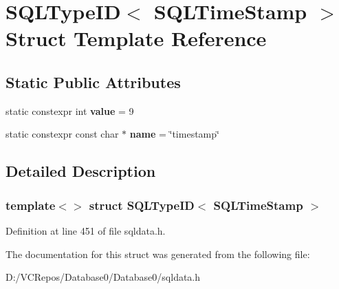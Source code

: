 \hypertarget{struct_s_q_l_type_i_d_3_01_s_q_l_time_stamp_01_4}{}\section{S\+Q\+L\+Type\+ID$<$ S\+Q\+L\+Time\+Stamp $>$ Struct Template Reference}
\label{struct_s_q_l_type_i_d_3_01_s_q_l_time_stamp_01_4}
\subsection*{Static Public Attributes}
\begin{DoxyCompactItemize}
\item 
\mbox{\label{struct_s_q_l_type_i_d_3_01_s_q_l_time_stamp_01_4_ae7cf8d5e1e438e051e3226b6c1d5a852}} 
static constexpr int {\bfseries value} = 9
\item 
\mbox{\label{struct_s_q_l_type_i_d_3_01_s_q_l_time_stamp_01_4_aa2c74b08746c81f4d4e668220a0eaaf3}} 
static constexpr const char $\ast$ {\bfseries name} = \char`\"{}timestamp\char`\"{}
\end{DoxyCompactItemize}


\subsection{Detailed Description}
\subsubsection*{template$<$$>$\newline
struct S\+Q\+L\+Type\+I\+D$<$ S\+Q\+L\+Time\+Stamp $>$}



Definition at line 451 of file sqldata.\+h.



The documentation for this struct was generated from the following file\+:\begin{DoxyCompactItemize}
\item 
D\+:/\+V\+C\+Repos/\+Database0/\+Database0/sqldata.\+h\end{DoxyCompactItemize}
